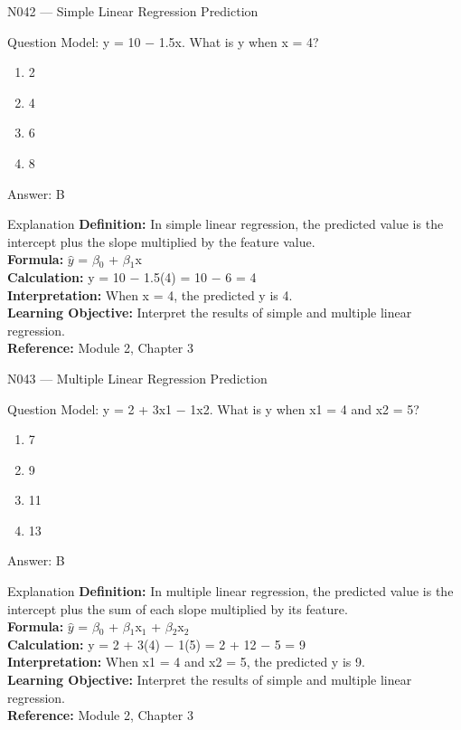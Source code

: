 \documentclass[aspectratio=169,8pt]{beamer}
\begin{document}
	\begin{frame}{N042 --- Simple Linear Regression Prediction}
		\begin{block}{Question}
			Model: y = 10 $-$ 1.5x. What is y when x = 4?
			\begin{enumerate}
				\item 2
				\item 4
				\item 6
				\item 8
			\end{enumerate}
		\end{block}
		\begin{exampleblock}{Answer: B}\end{exampleblock}
		\begin{block}{Explanation}
			\textbf{Definition:} In simple linear regression, the predicted value is the intercept plus the slope multiplied by the feature value.\\
			\textbf{Formula:} $\hat{y}$ = $\beta$$_{0}$ + $\beta$$_{1}$x\\
			\textbf{Calculation:} y = 10 $-$ 1.5(4) = 10 $-$ 6 = 4\\
			\textbf{Interpretation:} When x = 4, the predicted y is 4.\\
			\textbf{Learning Objective:} Interpret the results of simple and multiple linear regression.\\
			\textbf{Reference:} Module 2, Chapter 3
		\end{block}
	\end{frame}
	
	\begin{frame}{N043 --- Multiple Linear Regression Prediction}
		\begin{block}{Question}
			Model: y = 2 + 3x1 $-$ 1x2. What is y when x1 = 4 and x2 = 5?
			\begin{enumerate}
				\item 7
				\item 9
				\item 11
				\item 13
			\end{enumerate}
		\end{block}
		\begin{exampleblock}{Answer: B}\end{exampleblock}
		\begin{block}{Explanation}
			\textbf{Definition:} In multiple linear regression, the predicted value is the intercept plus the sum of each slope multiplied by its feature.\\
			\textbf{Formula:} $\hat{y}$ = $\beta$$_{0}$ + $\beta$$_{1}$x$_{1}$ + $\beta$$_{2}$x$_{2}$\\
			\textbf{Calculation:} y = 2 + 3(4) $-$ 1(5) = 2 + 12 $-$ 5 = 9\\
			\textbf{Interpretation:} When x1 = 4 and x2 = 5, the predicted y is 9.\\
			\textbf{Learning Objective:} Interpret the results of simple and multiple linear regression.\\
			\textbf{Reference:} Module 2, Chapter 3
		\end{block}
	\end{frame}
	
\end{document}
